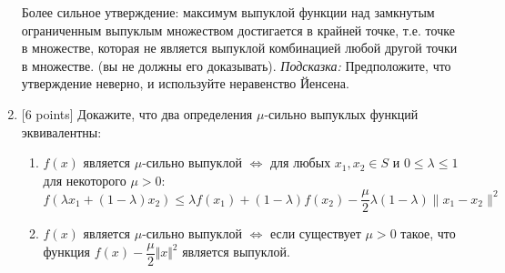 \documentclass[
  russian,
  letterpaper,
  DIV=11,
  numbers=noendperiod]{scrartcl}
\begin{document}
\begin{enumerate}
  Более сильное утверждение: максимум выпуклой функции над замкнутым
  ограниченным выпуклым множеством достигается в крайней точке, т.е.
  точке в множестве, которая не является выпуклой комбинацией любой
  другой точки в множестве. (вы не должны его доказывать).
  \emph{Подсказка:} Предположите, что утверждение неверно, и используйте
  неравенство Йенсена.
\item
  {[}6 points{]} Докажите, что два определения \(\mu\)-сильно выпуклых
  функций эквивалентны:

  \begin{enumerate}
  \def\labelenumii{\arabic{enumii}.}
  \item
    \(f(x)\) является \(\mu\)-сильно выпуклой \(\iff\) для любых
    \(x_1, x_2 \in S\) и \(0 \le \lambda \le 1\) для некоторого
    \(\mu > 0\): \[
     f(\lambda x_1 + (1 - \lambda)x_2) \le \lambda f(x_1) + (1 - \lambda)f(x_2) - \frac{\mu}{2} \lambda (1 - \lambda)\|x_1 - x_2\|^2
     \]
  \item
    \(f(x)\) является \(\mu\)-сильно выпуклой \(\iff\) если существует
    \(\mu>0\) такое, что функция \(f(x) - \dfrac{\mu}{2}\Vert x\Vert^2\)
    является выпуклой.
  \end{enumerate}
\end{enumerate}
\end{document}
